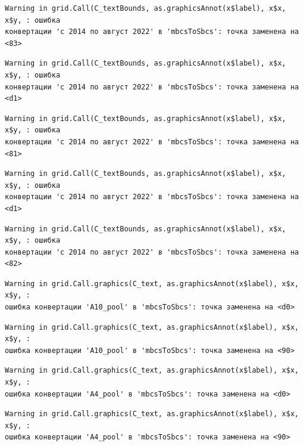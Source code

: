 \documentclass[
  letterpaper,
  DIV=11,
  numbers=noendperiod]{scrreprt}
\begin{document}
\begin{verbatim}
Warning in grid.Call(C_textBounds, as.graphicsAnnot(x$label), x$x, x$y, : ошибка
конвертации 'с 2014 по август 2022' в 'mbcsToSbcs': точка заменена на <83>
\end{verbatim}

\begin{verbatim}
Warning in grid.Call(C_textBounds, as.graphicsAnnot(x$label), x$x, x$y, : ошибка
конвертации 'с 2014 по август 2022' в 'mbcsToSbcs': точка заменена на <d1>
\end{verbatim}

\begin{verbatim}
Warning in grid.Call(C_textBounds, as.graphicsAnnot(x$label), x$x, x$y, : ошибка
конвертации 'с 2014 по август 2022' в 'mbcsToSbcs': точка заменена на <81>
\end{verbatim}

\begin{verbatim}
Warning in grid.Call(C_textBounds, as.graphicsAnnot(x$label), x$x, x$y, : ошибка
конвертации 'с 2014 по август 2022' в 'mbcsToSbcs': точка заменена на <d1>
\end{verbatim}

\begin{verbatim}
Warning in grid.Call(C_textBounds, as.graphicsAnnot(x$label), x$x, x$y, : ошибка
конвертации 'с 2014 по август 2022' в 'mbcsToSbcs': точка заменена на <82>
\end{verbatim}

\begin{verbatim}
Warning in grid.Call.graphics(C_text, as.graphicsAnnot(x$label), x$x, x$y, :
ошибка конвертации 'А10_pool' в 'mbcsToSbcs': точка заменена на <d0>
\end{verbatim}

\begin{verbatim}
Warning in grid.Call.graphics(C_text, as.graphicsAnnot(x$label), x$x, x$y, :
ошибка конвертации 'А10_pool' в 'mbcsToSbcs': точка заменена на <90>
\end{verbatim}

\begin{verbatim}
Warning in grid.Call.graphics(C_text, as.graphicsAnnot(x$label), x$x, x$y, :
ошибка конвертации 'А4_pool' в 'mbcsToSbcs': точка заменена на <d0>
\end{verbatim}

\begin{verbatim}
Warning in grid.Call.graphics(C_text, as.graphicsAnnot(x$label), x$x, x$y, :
ошибка конвертации 'А4_pool' в 'mbcsToSbcs': точка заменена на <90>
\end{verbatim}
\end{document}
